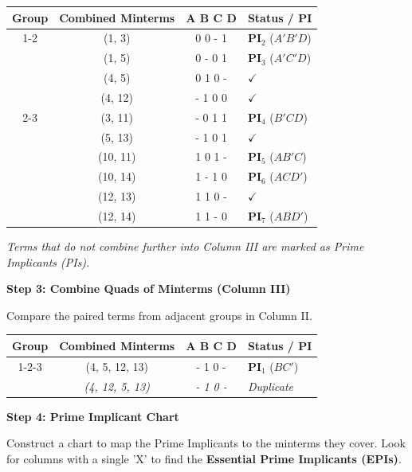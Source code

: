 \documentclass[12pt,a3paper]{article}
\begin{document}
\begin{enumerate}
\begin{tcolorbox}[enhanced,breakable,ansbox,colback=cC!4,colframe=cC,boxrule=0.8pt,arc=5pt,title={\textbf{Answer}},fonttitle=\bfseries\color{white},colbacktitle=cC]
\begin{center}
\begin{tabular}{cccl}
\toprule
\textbf{Group} & \textbf{Combined Minterms} & \textbf{A B C D} & \textbf{Status / PI} \\
\midrule
1-2 & (1, 3)  & 0 0 - 1 & \textbf{PI$_2$} ($A'B'D$) \\
    & (1, 5)  & 0 - 0 1 & \textbf{PI$_3$} ($A'C'D$) \\
    & (4, 5)  & 0 1 0 - & $\checkmark$ \\
    & (4, 12) & - 1 0 0 & $\checkmark$ \\
\midrule
2-3 & (3, 11) & - 0 1 1 & \textbf{PI$_4$} ($B'CD$) \\
    & (5, 13) & - 1 0 1 & $\checkmark$ \\
    & (10, 11)& 1 0 1 - & \textbf{PI$_5$} ($AB'C$) \\
    & (10, 14)& 1 - 1 0 & \textbf{PI$_6$} ($ACD'$) \\
    & (12, 13)& 1 1 0 - & $\checkmark$ \\
    & (12, 14)& 1 1 - 0 & \textbf{PI$_7$} ($ABD'$) \\
\bottomrule
\end{tabular}
\end{center}
\textit{Terms that do not combine further into Column III are marked as Prime Implicants (PIs).}

\vspace{1em}
\textbf{Step 3: Combine Quads of Minterms (Column III)}

Compare the paired terms from adjacent groups in Column II.

\begin{center}
\begin{tabular}{cccl}
\toprule
\textbf{Group} & \textbf{Combined Minterms} & \textbf{A B C D} & \textbf{Status / PI} \\
\midrule
1-2-3 & (4, 5, 12, 13) & - 1 0 - & \textbf{PI$_1$} ($BC'$) \\
      & \textit{(4, 12, 5, 13)} & \textit{- 1 0 -} & \textit{Duplicate} \\
\bottomrule
\end{tabular}
\end{center}

\vspace{1em}
\textbf{Step 4: Prime Implicant Chart}

Construct a chart to map the Prime Implicants to the minterms they cover. Look for columns with a single 'X' to find the \textbf{Essential Prime Implicants (EPIs)}.


\end{tcolorbox}
\end{enumerate}
\end{document}
